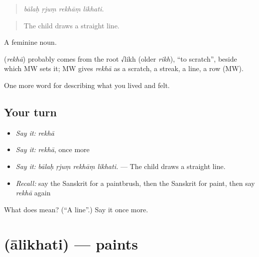 \begin{quote}
   
\end{quote}

\begin{quote}
\emph{bālaḥ ṛjuṃ rekhāṃ likhati.}
\end{quote}

\begin{quote}
The child draws a straight line.
\end{quote}

A feminine noun.

\begin{cousinweb}
\textbf{} (\emph{rekhā}) probably comes from the root √likh (older \emph{rikh}), \textquotedblleft{}to scratch\textquotedblright{}, beside which MW sets it; MW gives \emph{rekhā} as a scratch, a streak, a line, a row (MW).
\end{cousinweb}

\begin{grammarlens}[title={What you've built}]
One more word for describing what you lived and felt.
\end{grammarlens}

\subsection*{Your turn}
\begin{itemize}
\raggedright
  \item \emph{Say it:} \emph{rekhā}
  \item \emph{Say it:} \emph{rekhā}, once more
  \item \emph{Say it:} \emph{bālaḥ ṛjuṃ rekhāṃ likhati.} — The child draws a straight line.
  \item \emph{Recall:} say the Sanskrit for a paintbrush, then the Sanskrit for paint, then say \emph{rekhā} again
\end{itemize}

\begin{tcolorbox}[breakable,colback=teal!4,colframe=teal!35!black,title={Before you move on}]
What does  mean? (\textquotedblleft{}A line\textquotedblright{}.) Say it once more.
\end{tcolorbox}
\section[\texorpdfstring{\sk{आलिखति} (ālikhati)}{आलिखति (ālikhati)}]{ (ālikhati) — paints}

